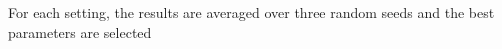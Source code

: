 \documentclass[preview]{standalone}
\begin{document}
For each setting, the results are averaged over three random seeds and the best parameters are selected\\
\end{document}
